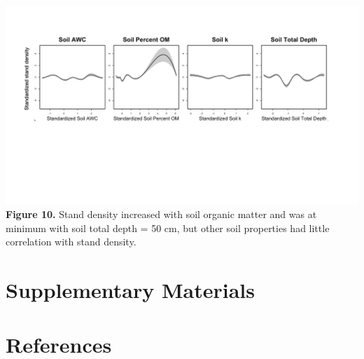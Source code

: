 \documentclass[
  12pt,
]{article}
\begin{document}
\includegraphics{./Figures/Fig7.png} \textbf{Figure 10.} Stand density
increased with soil organic matter and was at minimum with soil total
depth = 50 cm, but other soil properties had little correlation with
stand density. \clearpage

\newpage

\section{Supplementary Materials}\label{supplementary-materials}

\section*{References}\label{references}
\end{document}
